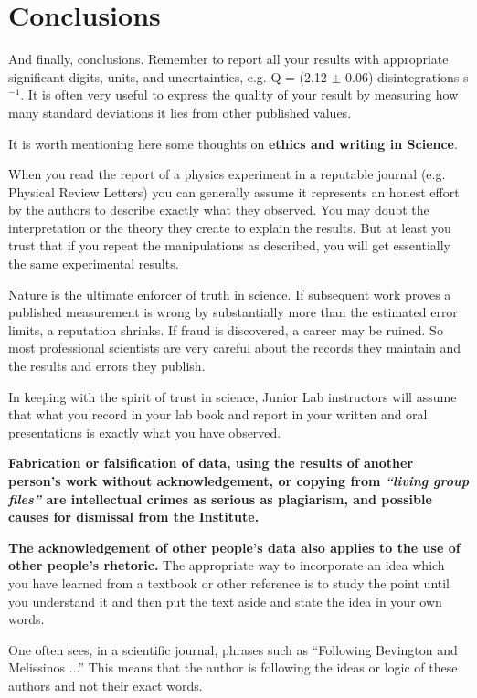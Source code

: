 \documentclass[aps,twocolumn,secnumarabic,nobalancelastpage,amsmath,amssymb,nofootinbib]{revtex4}
\begin{document}
\section{Conclusions}

And finally, conclusions.  Remember to report all your results with
appropriate significant digits, units, and uncertainties, e.g. Q =
(2.12 $\pm$ 0.06) disintegrations s$^{-1}$.  It is often very useful
to express the quality of your result by measuring how many standard
deviations it lies from other published values.

It is worth mentioning here some thoughts on {\bf ethics and writing
in Science}.

When you read the report of a physics experiment in a reputable
journal (e.g. Physical Review Letters) you can generally assume it
represents an honest effort by the authors to describe exactly what
they observed. You may doubt the interpretation or the theory they
create to explain the results. But at least you trust that if you
repeat the manipulations as described, you will get essentially the
same experimental results.

Nature is the ultimate enforcer of truth in science. If subsequent
work proves a published measurement is wrong by substantially more
than the estimated error limits, a reputation shrinks. If fraud is
discovered, a career may be ruined. So most professional scientists
are very careful about the records they maintain and the results and
errors they publish.

In keeping with the spirit of trust in science, Junior Lab instructors
will assume that what you record in your lab book and report in your
written and oral presentations is exactly what you have observed.

{\bf Fabrication or falsification of data, using the results of
another person's work without acknowledgement, or copying from {\em
``living group files''} are intellectual crimes as serious as
plagiarism, and possible causes for dismissal from the Institute.}

{\bf The acknowledgement of other people's data also applies to the use
of other people's rhetoric.} The appropriate way to incorporate an
idea which you have learned from a textbook or other reference is to
study the point until you understand it and then put the text aside
and state the idea in your own words.

One often sees, in a scientific journal, phrases such as ``Following
Bevington and Melissinos \cite{bevington2003, melissinos1966} ...''
This means that the author is following the ideas or logic of these
authors and not their exact words.
\end{document}
